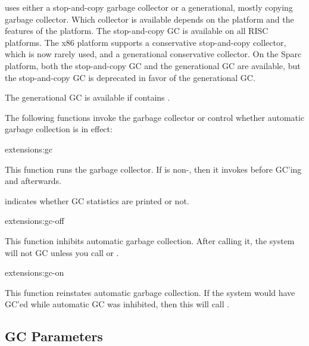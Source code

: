 \cmucl{} uses either a stop-and-copy garbage collector or a
generational, mostly copying garbage collector.  Which collector is
available depends on the platform and the features of the platform.
The stop-and-copy GC is available on all RISC platforms.  The x86
platform supports a conservative stop-and-copy collector, which is now
rarely used, and a generational conservative collector.  On the Sparc
platform, both the stop-and-copy GC and the generational GC are
available, but the stop-and-copy GC is deprecated in favor of the
generational GC.  

The generational GC is available if  contains
.


The following functions invoke the garbage collector or control whether
automatic garbage collection is in effect:

\begin{defun}[-cheney]{extensions:}{gc}{}
  
  This function runs the garbage collector.  If
   is non-\nil, then it invokes
   before GC'ing and
   afterwards.
  
   indicates whether GC statistics are printed or
  not. 

\end{defun}

\begin{defun}{extensions:}{gc-off}{}
  
  This function inhibits automatic garbage collection.  After calling
  it, the system will not GC unless you call  or
  .
\end{defun}

\begin{defun}{extensions:}{gc-on}{}
  
  This function reinstates automatic garbage collection.  If the
  system would have GC'ed while automatic GC was inhibited, then this
  will call .
\end{defun}

\subsection{GC Parameters}

